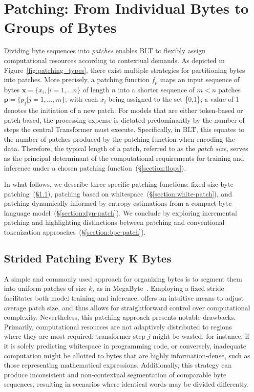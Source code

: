 \section{Patching: From Individual Bytes to Groups of Bytes}
\label{section:patching}

Dividing byte sequences into \textit{patches} enables {\textsc BLT} to flexibly assign computational resources according to contextual demands. As depicted in Figure~\ref{fig:patching_types}, there exist multiple strategies for partitioning bytes into patches. More precisely, a patching function $f_p$ maps an input sequence of bytes $\pmb{x}=\{x_i,|i=1,\ldots n\}$ of length $n$ into a shorter sequence of $m < n$ patches $\pmb{p}=\{p_j|j=1,\ldots,m\}$, with each $x_i$ being assigned to the set \{0,1\}; a value of 1 denotes the initiation of a new patch. For models that are either token-based or patch-based, the processing expense is dictated predominantly by the number of steps the central Transformer must execute. Specifically, in {\textsc BLT}, this equates to the number of patches produced by the patching function when encoding the data. Therefore, the typical length of a patch, referred to as the \textit{patch size}, serves as the principal determinant of the computational requirements for training and inference under a chosen patching function~(\S\ref{section:flops}).

In what follows, we describe three specific patching functions: fixed-size byte patching~(\S\ref{section:static-patch}), patching based on whitespace~(\S\ref{section:white-patch}), and patching dynamically informed by entropy estimations from a compact byte language model~(\S\ref{section:dyn-patch}). We conclude by exploring incremental patching and highlighting distinctions between patching and conventional tokenization approaches~(\S\ref{section:bpe-patch}).

\subsection{Strided Patching Every K Bytes}
\label{section:static-patch}

A simple and commonly used approach for organizing bytes is to segment them into uniform patches of size $k$, as in MegaByte~\citep{yu2023megabyte}. Employing a fixed stride facilitates both model training and inference, offers an intuitive means to adjust average patch size, and thus allows for straightforward control over computational complexity. Nevertheless, this patching approach presents notable drawbacks. Primarily, computational resources are not adaptively distributed to regions where they are most required: transformer step $j$ might be wasted, for instance, if it is solely predicting whitespace in programming code, or conversely, inadequate computation might be allotted to bytes that are highly information-dense, such as those representing mathematical expressions. Additionally, this strategy can produce inconsistent and non-contextual segmentation of comparable byte sequences, resulting in scenarios where identical words may be divided differently.

